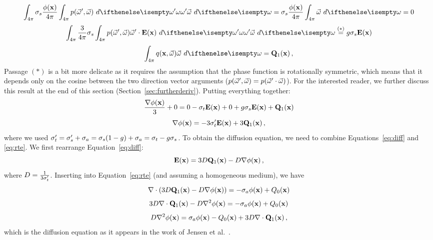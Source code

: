 \documentclass[10pt,a4paper]{article}
\begin{document}
$$
\sphere{\scattering \frac{\xfunc{\phi}}{4\pi} \sphere {p(\omegavec', \omegavec)}{\omega'} \omegavec}{} = \scattering \frac{\xfunc{\phi}}{4\pi} \sphere{\omegavec}{} = 0
$$
$$
\sphere{ \frac{3}{4\pi} \scattering  \sphere {p(\omegavec', \omegavec)  \omegavec' \cdot \xvecfunc{E}}{\omega'} \omegavec}{} \stackrel{(*)}{=} g \scattering  \xvecfunc{E}
$$
$$
\sphere{ \xomegafunc{q} \omegavec}{} =  \sourceonex \, ,
$$
Passage $(*)$ is a bit more delicate as it requires the assumption that the phase function is rotationally symmetric, which means that it depends only on the cosine between the two direction vector arguments ($p(\vec{\omega}', \vec{\omega}) = p(\vec{\omega}' \cdot \vec{\omega})$). For the interested reader, we further discuss this result at the end of this section (Section~\ref{sec:furtherderiv}). Putting everything together:
$$
\frac{{\nabla} {\phi}(\mathbf{x})}{3} + 0 = 0 -\sigma_t \mathbf{E}(\mathbf{x}) + 0 + g \sigma_s  \mathbf{E}(\mathbf{x}) + \mathbf{Q}_1(\mathbf{x})
$$
\begin{equation}
{\nabla} {\phi}(\mathbf{x}) = -3\sigma_t' \mathbf{E}(\mathbf{x}) + 3\mathbf{Q}_1(\mathbf{x}) \, ,
\label{eq:diff}
\end{equation}
where we used $\sigma_t' = \sigma_s' + \sigma_a = \sigma_s (1-g) + \sigma_a = \sigma_t -g \sigma_s$.
To obtain the diffusion equation, we need to combine Equations~\ref{eq:diff} and \ref{eq:rte}. We first rearrange Equation~\ref{eq:diff}:
$$
\mathbf{E}(\mathbf{x}) = 3 D \mathbf{Q}_1(\mathbf{x})  - D {\nabla} {\phi}(\mathbf{x}) \, ,
$$
where $D = \frac{1}{3 \sigma_t'}$. Inserting into Equation~\ref{eq:rte} (and assuming a homogeneous medium), we have
$$
{\nabla} \cdot (3 D \mathbf{Q}_1(\mathbf{x})  - D {\nabla} {\phi}(\mathbf{x})) = -\sigma_a  {\phi}(\mathbf{x}) + {Q_0}(\mathbf{x})
$$
$$
3 D {\nabla} \cdot \mathbf{Q}_1(\mathbf{x}) - D \nabla^2 {\phi}(\mathbf{x}) =  -\sigma_a  {\phi}(\mathbf{x}) + {Q_0}(\mathbf{x})
$$
\begin{equation} \label{eq:diffusion}
D \nabla^2 {\phi}(\mathbf{x}) = \sigma_a {\phi}(\mathbf{x}) - {Q_0}(\mathbf{x}) + 3 D {\nabla} \cdot \mathbf{Q}_1(\mathbf{x}) \, ,
\end{equation}
which is the diffusion equation as it appears in the work of Jensen et al.~\cite{jensen01}.
\end{document}
